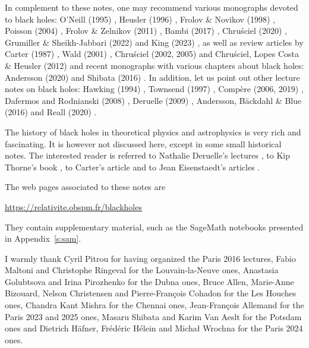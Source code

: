 \vspace{2ex}

In complement to these notes, one may recommend various monographs devoted to black holes:
O'Neill (1995) \cite{ONeil95}, Heusler (1996) \cite{Heusl96}, Frolov \& Novikov (1998) \cite{FroloN98},
Poisson (2004) \cite{Poiss04}, Frolov \& Zelnikov (2011) \cite{FroloZ11}, Bambi (2017) \cite{Bambi17},
Chru\'sciel (2020) \cite{Chrus20}, Grumiller \& Sheikh-Jabbari (2022) \cite{GrumiS22}
and King (2023) \cite{King23},
as well as review articles by
Carter (1987) \cite{Carte87}, Wald (2001) \cite{Wald01},
Chru\'sciel (2002, 2005) \cite{Chrus02, Chrus05} and Chru\'sciel, Lopes Costa \& Heusler (2012) \cite{ChrusLH12} and recent monographs with various chapters about black holes:
Andersson (2020) \cite{Ander20} and Shibata (2016) \cite{Shiba16}.
In addition, let us point out other lecture notes on black holes:
Hawking (1994) \cite{Hawki94,HawkiP15}, Townsend (1997) \cite{Towns97},
Compère (2006, 2019) \cite{Compe06,Compe19}, Dafermos and Rodnianski (2008) \cite{DaferR13},
Deruelle (2009) \cite{Derue09}, Andersson, Bäckdahl \& Blue (2016) \cite{AnderBB18}
and Reall (2020) \cite{Reall20}.

The history of black holes in theoretical physics and astrophysics is
very rich and fascinating. It is however not discussed here, except in some
small historical notes. The interested
reader is referred to Nathalie Deruelle's lectures \cite{Derue09}, to Kip Thorne's
book \cite{Thorn94}, to Carter's article \cite{Carte06}
and to Jean Eisenstaedt's articles \cite{Eisen82,Eisen93}.


The web pages associated to these notes are
\begin{center}
\url{https://relativite.obspm.fr/blackholes}
\end{center}
They contain supplementary material, such as the SageMath notebooks presented in
Appendix~\ref{s:sam}.

\vspace{2ex}

I warmly thank Cyril Pitrou for having organized the Paris 2016 lectures,
Fabio Maltoni and Christophe Ringeval for the Louvain-la-Neuve ones,
Anastasia Golubtsova and Irina Pirozhenko for the Dubna ones,
Bruce Allen, Marie-Anne Bizouard, Nelson Christensen and Pierre-François Cohadon for the Les Houches ones,
Chandra Kant Mishra for the Chennai ones,
Jean-François Allemand for the Paris 2023 and 2025 ones, Masaru Shibata and Karim Van Aeslt for the Potsdam ones and Dietrich Häfner, Frédéric Hélein and Michał Wrochna for the Paris 2024 ones.

